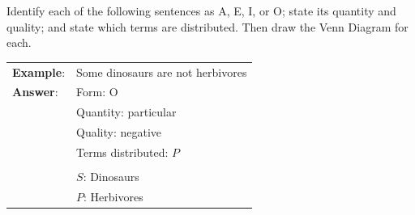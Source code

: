 
\practiceproblems

\problempart Identify each of the following sentences as A, E, I, or O; state its quantity and quality; and state which terms are distributed. Then draw the Venn Diagram for each.

\begin{longtabu}{p{.1\linewidth}p{.9\linewidth}}
\textbf{Example}: & Some dinosaurs are not herbivores \\
\textbf{Answer}: & Form: O\\
&Quantity: particular \\
&Quality: negative \\
&Terms distributed: $P$ \\
&
\noindent {}\\
& $S$: Dinosaurs \\
& $P$: Herbivores
\end{longtabu}

